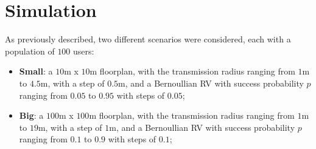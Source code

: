 %
\chapter{Simulation}\label{simulation}
As previously described, two different scenarios were considered, each with a population of $100$ users:
\begin{itemize}
    \item \textbf{Small}: a $10$m x $10$m floorplan, with the transmission
    radius ranging from $1$m to $4.5$m, with a step of $0.5$m, and a Bernoullian
    RV with success probability $p$ ranging from $0.05$ to $0.95$ with steps of
    $0.05$;
    \item \textbf{Big}: a $100$m x $100$m floorplan, with the transmission
    radius ranging from $1$m to $19$m, with a step of $1$m, and a Bernoullian RV
    with success probability $p$ ranging from $0.1$ to $0.9$ with steps of $0.1$;
\end{itemize}
